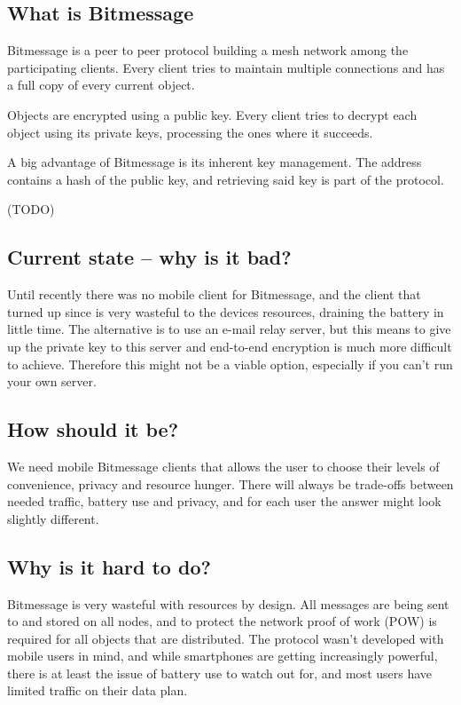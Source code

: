 \documentclass{bfh}
\begin{document}
  \subsection{What is Bitmessage}
  
  Bitmessage is a peer to peer protocol building a mesh network among the participating clients. Every client tries to maintain multiple connections and has a full copy of every current object.
  
  Objects are encrypted using a public key. Every client tries to decrypt each object using its private keys, processing the ones where it succeeds.
  
  A big advantage of Bitmessage is its inherent key management. The address contains a hash of the public key, and retrieving said key is part of the protocol.

  (TODO)\newpage

  \subsection{Current state -- why is it bad?}
  Until recently there was no mobile client for Bitmessage, and the client that turned up since is very wasteful to the devices resources, draining the battery in little time. The alternative is to use an e-mail relay server, but this means to give up the private key to this server and end-to-end encryption is much more difficult to achieve. Therefore this might not be a viable option, especially if you can't run your own server.

  \subsection{How should it be?}
  We need mobile Bitmessage clients that allows the user to choose their levels of convenience, privacy and resource hunger. There will always be trade-offs between needed traffic, battery use and privacy, and for each user the answer might look slightly different.

  \subsection{Why is it hard to do?}
  Bitmessage is very wasteful with resources by design. All messages are being sent to and stored on all nodes, and to protect the network proof of work (POW) is required for all objects that are distributed. The protocol wasn't developed with mobile users in mind, and while smartphones are getting increasingly powerful, there is at least the issue of battery use to watch out for, and most users have limited traffic on their data plan.
\end{document}
